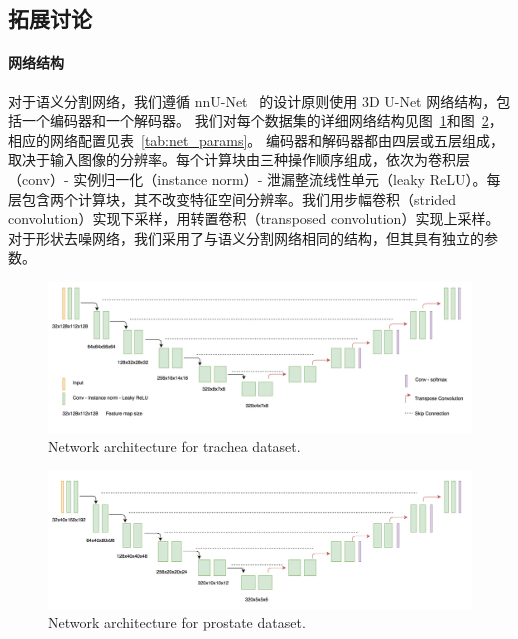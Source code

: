 \subsection{拓展讨论} \label{sec:extension}

\paragraph{网络结构}
对于语义分割网络，我们遵循 nnU-Net~\citep{isensee2019automated} 的设计原则使用 3D U-Net 网络结构，包括一个编码器和一个解码器。
我们对每个数据集的详细网络结构见图~\ref{fig:s_net1}和图~\ref{fig:s_net3}，相应的网络配置见表~\ref{tab:net_params}。
编码器和解码器都由四层或五层组成，取决于输入图像的分辨率。每个计算块由三种操作顺序组成，依次为卷积层（conv）- 实例归一化（instance norm）- 泄漏整流线性单元（leaky ReLU）。每层包含两个计算块，其不改变特征空间分辨率。我们用步幅卷积（strided convolution）实现下采样，用转置卷积（transposed convolution）实现上采样。对于形状去噪网络，我们采用了与语义分割网络相同的结构，但其具有独立的参数。

    \begin{figure}[tbp]
        \centering 
        \includegraphics[width=1.0\textwidth]{img/c3/s_net.png}
        {Network architecture for trachea dataset.}
        \label{fig:s_net1}
    \end{figure}




    \begin{figure}[tbp]
        \centering 
        \includegraphics[width=1.0\textwidth]{img/c3/s_net3.png}
        {Network architecture for prostate dataset.}
        \label{fig:s_net3}
    \end{figure}

